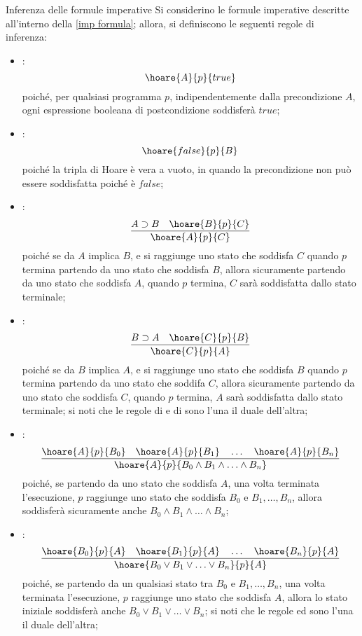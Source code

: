 \documentclass[a4paper, 12pt]{report}
\begin{document}
    \begin{framedprop}{Inferenza delle formule imperative}
        Si considerino le formule imperative descritte all'interno della \cref{imp formula}; allora, si definiscono le seguenti regole di inferenza:

        \begin{itemize}
            \item {}: $$\hoare{A}{p}{true}$$ poiché, per qualsiasi programma $p$, indipendentemente dalla precondizione $A$, ogni espressione booleana di postcondizione soddisferà $true$;
            \item {}: $$\hoare{false}{p}{B}$$ poiché la tripla di Hoare è vera a vuoto, in quando la precondizione non può essere soddisfatta poiché è $false$;
            \item {}: $$\dfrac{A \supset B \quad \hoare{B}{p}{C}}{\hoare{A}{p}{C}}$$ poiché se da $A$ implica $B$, e si raggiunge uno stato che soddisfa $C$ quando $p$ termina partendo da uno stato che soddisfa $B$, allora sicuramente partendo da uno stato che soddisfa $A$, quando $p$ termina, $C$ sarà soddisfatta dallo stato terminale;
            \item {}: $$\dfrac{B \supset A \quad \hoare{C}{p}{B}}{\hoare{C}{p}{A}}$$ poiché se da $B$ implica $A$, e si raggiunge uno stato che soddisfa $B$ quando $p$ termina partendo da uno stato che soddifa $C$, allora sicuramente partendo da uno stato che soddisfa $C$, quando $p$ termina, $A$ sarà soddisfatta dallo stato terminale; si noti che le regole di  e di  sono l'una il duale dell'altra;
            \item {}: $$\dfrac{\hoare{A}{p}{B_0} \quad \hoare{A}{p}{B_1} \quad \ldots \quad \hoare{A}{p}{B_n}}{\hoare{A}{p}{B_0 \land B_1 \land \ldots \land B_n}}$$ poiché, se partendo da uno stato che soddisfa $A$, una volta terminata l'esecuzione, $p$ raggiunge uno stato che soddisfa $B_0$ e $B_1, \ldots, B_n$, allora soddisferà sicuramente anche $B_0 \land B_1 \land \ldots \land B_n$;
            \item {}: $$\dfrac{\hoare{B_0}{p}{A} \quad \hoare{B_1}{p}{A} \quad \ldots \quad \hoare{B_n}{p}{A}}{\hoare{B_0 \lor B_1 \lor \ldots \lor B_n}{p}{A}}$$ poiché, se partendo da un qualsiasi stato tra $B_0$ e $B_1, \ldots, B_n$, una volta terminata l'esecuzione, $p$ raggiunge uno stato che soddisfa $A$, allora lo stato iniziale soddisferà anche $B_0 \lor B_1 \lor \ldots \lor B_n$; si noti che le regole  ed  sono l'una il duale dell'altra;
        \end{itemize}
    \end{framedprop}
\end{document}
